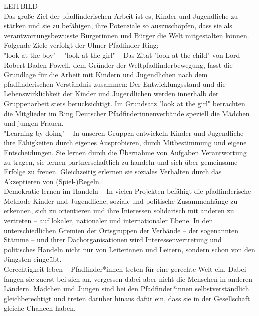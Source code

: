 LEITBILD
\\

Das große Ziel der pfadfinderischen Arbeit ist es, Kinder und Jugendliche zu stärken und sie zu 
befähigen, ihre Potenziale so auszuschöpfen, dass sie als verantwortungsbewusste Bürgerinnen und 
Bürger die Welt mitgestalten können. Folgende Ziele verfolgt der Ulmer Pfadfinder-Ring:
\\

"look at the boy" – "look at the girl" – Das Zitat "look at the child" von Lord Robert Baden-Powell, 
dem Gründer der Weltpfadfinderbewegung, fasst die Grundlage für die Arbeit mit Kindern und 
Jugendlichen nach dem pfadfinderischen Verständnis zusammen: Der Entwicklungsstand und die 
Lebenswirklichkeit der Kinder und Jugendlichen werden innerhalb der Gruppenarbeit stets 
berücksichtigt. Im Grundsatz "look at the girl" betrachten die Mitglieder im Ring Deutscher 
Pfadfinderinnenverbände speziell die Mädchen und jungen Frauen.
\\

"Learning by doing" – In unseren Gruppen entwickeln Kinder und Jugendliche ihre Fähigkeiten durch 
eigenes Ausprobieren, durch Mitbestimmung und eigene Entscheidungen. Sie lernen durch die Übernahme 
von Aufgaben Verantwortung zu tragen, sie lernen partnerschaftlich zu handeln und sich über 
gemeinsame Erfolge zu freuen. Gleichzeitig erlernen sie soziales Verhalten durch das Akzeptieren 
von (Spiel-)Regeln.
\\

Demokratie lernen im Handeln – In vielen Projekten befähigt die pfadfinderische Methode Kinder und 
Jugendliche, soziale und politische Zusammenhänge zu erkennen, sich zu orientieren und ihre 
Interessen solidarisch mit anderen zu vertreten – auf lokaler, nationaler und internationaler Ebene. 
In den unterschiedlichen Gremien der Ortsgruppen der Verbände – der sogenannten Stämme – und ihrer 
Dachorganisationen wird Interessenvertretung und politisches Handeln nicht nur von Leiterinnen und 
Leitern, sondern schon von den Jüngsten eingeübt.
\\

Gerechtigkeit leben – Pfadfinder*innen treten für eine gerechte Welt ein. Dabei fangen sie zuerst 
bei sich an, vergessen dabei aber nicht die Menschen in anderen Ländern. Mädchen und Jungen sind bei 
den Pfadfinder*innen selbstverständlich gleichberechtigt und treten darüber hinaus dafür ein, dass 
sie in der Gesellschaft gleiche Chancen haben.
\\

